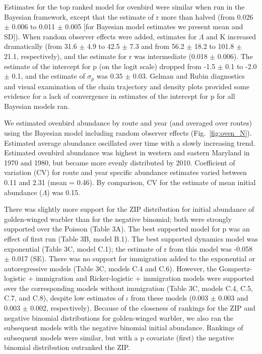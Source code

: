 \documentclass[12pt]{article}
\begin{document}
Estimates for the top ranked model for ovenbird
were similar when
run in the Bayesian framework, except that the estimate of r
more than halved (from 0.026 $\pm$ 0.006 to 0.011 $\pm$ 0.005 [for
Bayesian model estimates we present mean and SD]). When random observer effects
were added, estimates for $\Lambda$ and K increased dramatically
(from 31.6 $\pm$ 4.9 to 42.5 $\pm$ 7.3 and from 56.2 $\pm$ 18.2 to 101.8 $\pm$ 21.1,
respectively), and the estimate for r was intermediate (0.018 $\pm$ 0.006). The
estimate of the intercept for p (on the logit scale) dropped from -1.5 $\pm$
0.1 to -2.0 $\pm$ 0.1, and the estimate of $\sigma_p$ was 0.35 $\pm$ 0.03.
Gelman and Rubin diagnostics and visual examination of the chain trajectory and density plots
provided some evidence for a lack of convergence in estimates of the
intercept for p for all Bayesian models ran.  

We estimated ovenbird abundance by route and year (and averaged over routes) 
using the Bayesian model including random observer effects (Fig.~\ref{fig:oven_N}).  
Estimated average abundance oscillated over time with a slowly increasing trend.  Estimated ovenbird
abundance was highest in western and eastern Maryland in 1970 and 1980, but became
more evenly distributed by 2010.  Coefficient of variation (CV) for route and year specific
abundance estimates varied between 0.11 and 2.31 (mean = 0.46).  By comparison, CV
for the estimate of mean initial abundance ($\Lambda$) was 0.15.

There was slightly more support for the ZIP distribution for initial
abundance of golden-winged warbler than for the negative binomial; both were strongly
supported over the Poisson (Table 3A). The best
supported model for p was an effect of first run (Table 3B, model
B.1). The best supported dynamics model was exponential
(Table 3C, model C.1); the estimate of r from this model was -0.058
$\pm$ 0.017 (SE). There was no support for immigration added to the
exponential or autoregressive models (Table 3C, models C.4 and
C.6).
However, the Gompertz-logistic + immigration and Ricker-logistic + immigration
models were supported over the corresponding models without immigration
(Table 3C, models C.4, C.5, C.7, and C.8), despite low estimates
of $\iota$ from these models (0.003 $\pm$ 0.003 and 0.003 $\pm$
0.002, respectively).  
Because of the closeness of rankings for the ZIP and negative binomial
distributions for golden-winged warbler, we also ran the subsequent models with the
negative binomial initial abundance. Rankings of subsequent
models were similar, but with a p covariate (first) the negative
binomial distribution outranked the ZIP.
\end{document}
